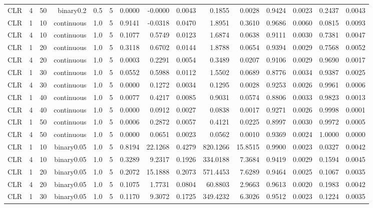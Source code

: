 \begin{longtable}{rrrrrrrrrrrrrrr}
  CLR & 4 & 50 & binary0.2 & 0.5 & 5 & 0.0000 & -0.0000 & 0.0043 & 0.1855 & 0.0028 & 0.9424 & 0.0023 & 0.2437 & 0.0043 \\ 
  CLR & 1 & 10 & continuous & 1.0 & 5 & 0.9141 & -0.0318 & 0.0470 & 1.8951 & 0.3610 & 0.9686 & 0.0060 & 0.0815 & 0.0093 \\ 
  CLR & 4 & 10 & continuous & 1.0 & 5 & 0.1077 & 0.5749 & 0.0123 & 1.6874 & 0.0638 & 0.9111 & 0.0030 & 0.7381 & 0.0047 \\ 
  CLR & 1 & 20 & continuous & 1.0 & 5 & 0.3118 & 0.6702 & 0.0144 & 1.8788 & 0.0654 & 0.9394 & 0.0029 & 0.7568 & 0.0052 \\ 
  CLR & 4 & 20 & continuous & 1.0 & 5 & 0.0003 & 0.2291 & 0.0054 & 0.3489 & 0.0207 & 0.9106 & 0.0029 & 0.9690 & 0.0017 \\ 
  CLR & 1 & 30 & continuous & 1.0 & 5 & 0.0552 & 0.5988 & 0.0112 & 1.5502 & 0.0689 & 0.8776 & 0.0034 & 0.9387 & 0.0025 \\ 
  CLR & 4 & 30 & continuous & 1.0 & 5 & 0.0000 & 0.1272 & 0.0034 & 0.1295 & 0.0028 & 0.9253 & 0.0026 & 0.9961 & 0.0006 \\ 
  CLR & 1 & 40 & continuous & 1.0 & 5 & 0.0077 & 0.4217 & 0.0085 & 0.9031 & 0.0574 & 0.8806 & 0.0033 & 0.9823 & 0.0013 \\ 
  CLR & 4 & 40 & continuous & 1.0 & 5 & 0.0000 & 0.0912 & 0.0027 & 0.0838 & 0.0017 & 0.9271 & 0.0026 & 0.9998 & 0.0001 \\ 
  CLR & 1 & 50 & continuous & 1.0 & 5 & 0.0006 & 0.2872 & 0.0057 & 0.4121 & 0.0225 & 0.8997 & 0.0030 & 0.9972 & 0.0005 \\ 
  CLR & 4 & 50 & continuous & 1.0 & 5 & 0.0000 & 0.0651 & 0.0023 & 0.0562 & 0.0010 & 0.9369 & 0.0024 & 1.0000 & 0.0000 \\ 
  CLR & 1 & 10 & binary0.05 & 1.0 & 5 & 0.8194 & 22.1268 & 0.4279 & 820.1266 & 15.8515 & 0.9900 & 0.0023 & 0.0327 & 0.0042 \\ 
  CLR & 4 & 10 & binary0.05 & 1.0 & 5 & 0.3289 & 9.2317 & 0.1926 & 334.0188 & 7.3684 & 0.9419 & 0.0029 & 0.1594 & 0.0045 \\ 
  CLR & 1 & 20 & binary0.05 & 1.0 & 5 & 0.2072 & 15.1888 & 0.2073 & 571.4453 & 7.6289 & 0.9464 & 0.0025 & 0.1067 & 0.0035 \\ 
  CLR & 4 & 20 & binary0.05 & 1.0 & 5 & 0.1075 & 1.7731 & 0.0804 & 60.8803 & 2.9663 & 0.9613 & 0.0020 & 0.1983 & 0.0042 \\ 
  CLR & 1 & 30 & binary0.05 & 1.0 & 5 & 0.1170 & 9.3072 & 0.1725 & 349.4232 & 6.3026 & 0.9512 & 0.0023 & 0.1224 & 0.0035 \\ 

\end{longtable}
